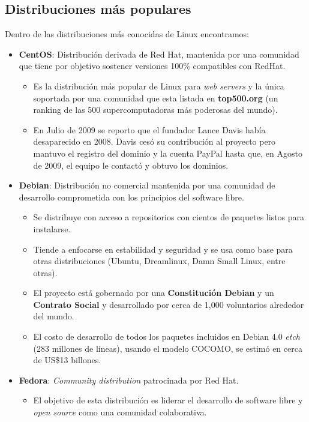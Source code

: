 \documentclass[spanish]{article}
\begin{document}
\subsection{Distribuciones más populares}
Dentro de las distribuciones más conocidas de Linux encontramos:
\begin{itemize}
	\item \textbf{CentOS}: Distribución derivada de Red Hat, mantenida por una comunidad que tiene por objetivo sostener versiones 100\% compatibles con RedHat. 
		\begin{itemize}
		\item Es la distribución más popular de Linux para \textit{web servers} y la única soportada por una comunidad que esta listada en \textbf{top500.org} (un ranking de las 500 supercomputadoras más poderosas del mundo)\cite{LinuxForWebsites}.
		\item En Julio de 2009 se reporto que el fundador Lance Davis había desaparecido en 2008. Davis cesó su contribución al proyecto pero mantuvo el registro del dominio y la cuenta PayPal hasta que, en Agosto de 2009, el equipo le contactó y obtuvo los dominios.
		\end{itemize}
	\item \textbf{Debian}: Distribución no comercial mantenida por una comunidad de desarrollo comprometida con los principios del software libre. 
		\begin{itemize}
		\item Se distribuye con acceso a repositorios con cientos de paquetes listos para instalarse.
		\item Tiende a enfocarse en estabilidad y seguridad y se usa como base para otras distribuciones (Ubuntu, Dreamlinux, Damn Small Linux, entre otras).
		\item El proyecto está gobernado por una \textbf{Constitución Debian} y un \textbf{Contrato Social} y desarrollado por cerca de 1,000 voluntarios alrededor del mundo. 
		\item El costo de desarrollo de todos los paquetes incluidos en Debian 4.0 \textit{etch} (283 millones de líneas), usando el modelo COCOMO, se estimó en cerca de US\$13 billones\cite{debianCost}.
		\end{itemize}
	\item \textbf{Fedora}: \textit{Community distribution} patrocinada por Red Hat. 
		\begin{itemize}
		\item El objetivo de esta distribución es liderar el desarrollo de software libre y \textit{open source} como una comunidad colaborativa.

\end{itemize}
\end{itemize}
\end{document}

